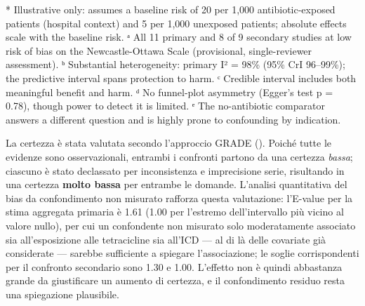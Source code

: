 \documentclass[
  letterpaper,
  DIV=11,
  numbers=noendperiod]{scrartcl}
\begin{document}
* Illustrative only: assumes a baseline risk of 20 per 1,000
antibiotic-exposed patients (hospital context) and 5 per 1,000 unexposed
patients; absolute effects scale with the baseline risk. ᵃ All 11
primary and 8 of 9 secondary studies at low risk of bias on the
Newcastle-Ottawa Scale (provisional, single-reviewer assessment). ᵇ
Substantial heterogeneity: primary I² = 98\% (95\% CrI 96--99\%); the
predictive interval spans protection to harm. ᶜ Credible interval
includes both meaningful benefit and harm. ᵈ No funnel-plot asymmetry
(Egger's test p = 0.78), though power to detect it is limited. ᵉ The
no-antibiotic comparator answers a different question and is highly
prone to confounding by indication.

La certezza è stata valutata secondo l'approccio GRADE
(). Poiché tutte le
evidenze sono osservazionali, entrambi i confronti partono da una
certezza \emph{bassa}; ciascuno è stato declassato per inconsistenza e
imprecisione serie, risultando in una certezza \textbf{molto bassa} per
entrambe le domande. L'analisi quantitativa del bias da confondimento
non misurato rafforza questa valutazione: l'E-value per la stima
aggregata primaria è 1.61 (1.00 per l'estremo dell'intervallo più vicino
al valore nullo), per cui un confondente non misurato solo moderatamente
associato sia all'esposizione alle tetracicline sia all'ICD --- al di là
delle covariate già considerate --- sarebbe sufficiente a spiegare
l'associazione; le soglie corrispondenti per il confronto secondario
sono 1.30 e 1.00. L'effetto non è quindi abbastanza grande da
giustificare un aumento di certezza, e il confondimento residuo resta
una spiegazione plausibile.
\end{document}
